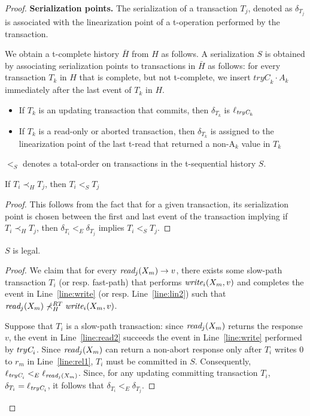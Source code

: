 \begin{proof}
\vspace{1mm}\noindent\textbf{Serialization points.}
The serialization of a transaction $T_j$, denoted as $\delta_{T_j}$ is
associated with the linearization point of a t-operation 
performed by the transaction.

We obtain a t-complete history ${\bar H}$ from $H$ as follows. 
A serialization $S$ is obtained by associating serialization points to transactions in ${\bar H}$ as follows:
for every transaction $T_k$ in $H$ that is complete, but not t-complete, 
we insert $\textit{tryC}_k\cdot A_k$ immediately 
after the last event of $T_k$ in $H$. 
%
\begin{itemize}
\item If $T_k$ is an updating transaction that commits, then $\delta_{T_k}$ is $\ell_{\textit{tryC}_k}$
\item If $T_k$ is a read-only or aborted transaction,
then $\delta_{T_k}$ is assigned to the linearization point of the last t-read that returned a non-A$_k$ value in $T_k$
\end{itemize}
%
$<_S$ denotes a total-order on transactions in the t-sequential history $S$.
%
\begin{claim}
\label{cl:seq}
If $T_i \prec_{H}T_j$, then $T_i <_S T_j$
\end{claim}
%
\begin{proof}
This follows from the fact that for a given transaction, its
serialization point is chosen between the first and last event of the transaction
implying if $T_i \prec_{H} T_j$, then $\delta_{T_i} <_{E} \delta_{T_j}$ implies $T_i <_S T_j$.
\end{proof}
%
%
\begin{claim}
\label{cl:readfrom}
$S$ is legal.
\end{claim}
%
\begin{proof}
%
We claim that for every $\textit{read}_j(X_m) \rightarrow v$, there exists some slow-path transaction $T_i$ (or resp. fast-path)
that performs $\textit{write}_i(X_m,v)$ and completes the event in Line~\ref{line:write} (or resp. Line~\ref{line:lin2}) such that
$\textit{read}_j(X_m) \not\prec_H^{RT} \textit{write}_i(X_m,v)$.

Suppose that $T_i$ is a slow-path transaction:
since $\textit{read}_j(X_m)$ returns the response $v$, the event in Line~\ref{line:read2}
succeeds the event in Line~\ref{line:write} performed by $\textit{tryC}_i$. 
Since $\textit{read}_j(X_m)$ can return a non-abort response only after $T_i$ writes $0$ to $r_m$ in
Line~\ref{line:rel1}, $T_i$ must be committed in $S$.
Consequently,
$\ell_{\textit{tryC}_i} <_E \ell_{\textit{read}_j(X_m)}$.
Since, for any updating
committing transaction $T_i$, $\delta_{T_i}=\ell_{\textit{tryC}_i}$, it follows that
$\delta_{T_{i}} <_E \delta_{T_{j}}$.


\end{proof}
\end{proof}

